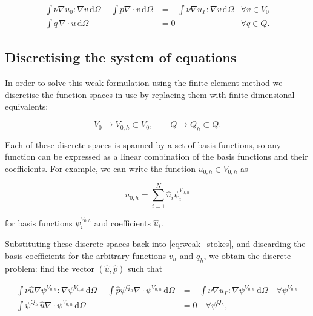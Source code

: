 \documentclass[thesis]{subfiles}
\begin{document}
\begin{equation} \label{eq:weak_stokes}
  \begin{aligned}
    \int \nu \nabla u_0 : \nabla v \, \textrm{d}\Omega
    - \int p \nabla \cdot v \, \textrm{d}\Omega
    &=
    - \int \nu \nabla u_\Gamma : \nabla v \, \textrm{d}\Omega
    &\forall v \in V_0 \\
    \int q \, \nabla \cdot u \, \textrm{d}\Omega
    &= 0
    &\forall q \in Q.
  \end{aligned}
\end{equation}

\subsection{Discretising the system of equations}

In order to solve this weak formulation using the finite element method we discretise the function spaces in use by replacing them with finite dimensional equivalents:

\begin{equation*}
  V_0 \to V_{0,h} \subset V_0,
  \quad
  \quad
  Q \to Q_h \subset Q.
\end{equation*}

Each of these discrete spaces is spanned by a set of basis functions, so any function can be expressed as a linear combination of the basis functions and their coefficients.
For example, we can write the function $u_{0,h} \in V_{0,h}$ as

\begin{equation*}
  u_{0,h} = \sum^N_{i=1} \hat u_i \psi^{V_{0,h}}_i
\end{equation*}

for basis functions $\psi^{V_{0,h}}_i$ and coefficients $\hat u_i$.

Substituting these discrete spaces back into \cref{eq:weak_stokes}, and discarding the basis coefficients for the arbitrary functions $v_h$ and $q_h$, we obtain the discrete problem: find the vector $(\hat u, \hat p)$ such that

\begin{equation}
  \begin{aligned}
    \int \nu \hat u \nabla \psi^{V_{0,h}} : \nabla \psi^{V_{0,h}} \, \textrm{d}\Omega
    - \int \hat p \psi^{Q_h} \nabla \cdot \psi^{V_{0,h}} \, \textrm{d}\Omega
    &=
    - \int \nu \nabla u_\Gamma : \nabla \psi^{V_{0,h}} \, \textrm{d}\Omega
    \quad \forall \psi^{V_{0,h}} \\
    \int \psi^{Q_h} \, \hat u \nabla \cdot \psi^{V_{0,h}} \, \textrm{d}\Omega
    &= 0
    \quad \forall \psi^{Q_h},
  \end{aligned}
\end{equation}
\end{document}
